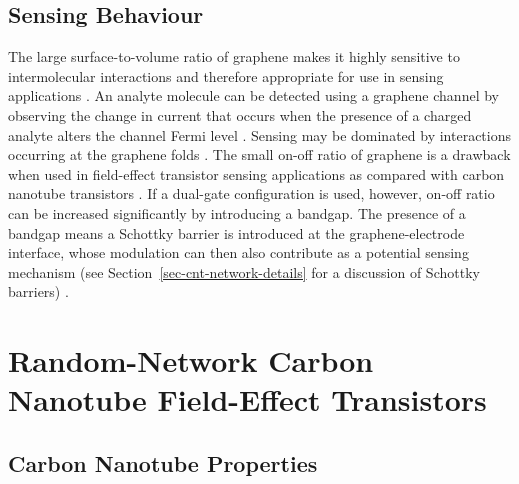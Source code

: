 \documentclass[
  a4paper,
]{scrbook}
\begin{document}
\hypertarget{sensing-behaviour}{%
\subsection{Sensing Behaviour}\label{sensing-behaviour}}

The large surface-to-volume ratio of graphene makes it highly sensitive
to intermolecular interactions and therefore appropriate for use in
sensing applications \autocite{Ohno2015,Tran2016}. An analyte molecule
can be detected using a graphene channel by observing the change in
current that occurs when the presence of a charged analyte alters the
channel Fermi level \autocite{Heller2010,Ohno2015}. Sensing may be
dominated by interactions occurring at the graphene folds
\autocite{Zhao2012}. The small on-off ratio of graphene is a drawback
when used in field-effect transistor sensing applications as compared
with carbon nanotube transistors \autocite{Novoselov2004}. If a
dual-gate configuration is used, however, on-off ratio can be increased
significantly by introducing a bandgap. The presence of a bandgap means
a Schottky barrier is introduced at the graphene-electrode interface,
whose modulation can then also contribute as a potential sensing
mechanism (see Section~\ref{sec-cnt-network-details} for a discussion of
Schottky barriers) \autocite{Xia2010}.

\hypertarget{random-network-carbon-nanotube-field-effect-transistors}{%
\section{Random-Network Carbon Nanotube Field-Effect
Transistors}\label{random-network-carbon-nanotube-field-effect-transistors}}

\hypertarget{sec-carbon-nanotubes}{%
\subsection{Carbon Nanotube Properties}\label{sec-carbon-nanotubes}}
\end{document}
